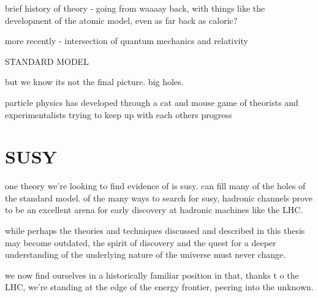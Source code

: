 brief history of theory - going from waaaay back, with things like the
development of the atomic model, even as far back as caloric?

more recently - intersection of quantum mechanics and relativity

STANDARD MODEL

but we know its not the final picture. big holes.

particle physics has developed through a cat and mouse game of theorists and
experimentalists trying to keep up with each others progress

\section{SUSY}
one theory we're looking to find evidence of is susy. can fill many of the holes
of the standard model.
of the many ways to search for susy, hadronic channels prove to be an excellent
arena for early discovery at hadronic machines like the LHC.


while perhaps the theories and techniques discussed and described in this thesis
may become outdated, the spirit of discovery and the quest for a deeper
understanding of the underlying nature of the universe must never change.

we now find ourselves in a historically familiar position in that, thanks t
o the LHC, we're standing
at the edge of the energy frontier, peering into the unknown.
